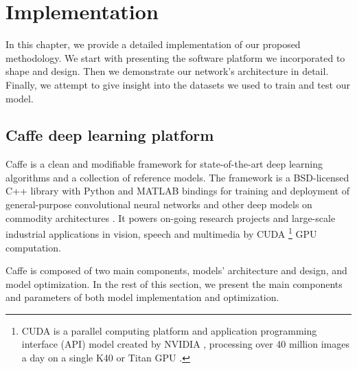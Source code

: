 
\chapter{Implementation}
\label{sec:implementation}
\noindent

\noindent In this chapter, we provide a detailed implementation of our proposed methodology. We start with presenting the software platform we incorporated to shape and design. Then we demonstrate our network's architecture in detail. Finally, we attempt to give insight into the datasets we used to train and test our model. 

\section{Caffe deep learning platform}

Caffe is a clean and modifiable framework for state-of-the-art deep learning algorithms and a collection of reference models. The framework is a BSD-licensed C++ library with Python and MATLAB bindings for training and deployment of general-purpose convolutional neural networks and other deep models on commodity architectures \cite{jia2014caffe}. It powers on-going research projects and large-scale industrial applications in vision, speech and multimedia by CUDA \footnote{CUDA is a parallel computing platform and application programming interface (API) model created by NVIDIA \cite{cuda}, processing over 40 million images a day on a single K40 or Titan GPU \cite{jia2014caffe}.}  GPU computation.

Caffe is composed of two main components, models' architecture and design, and model optimization. In the rest of this section, we present the main components and parameters of both model implementation and optimization.
